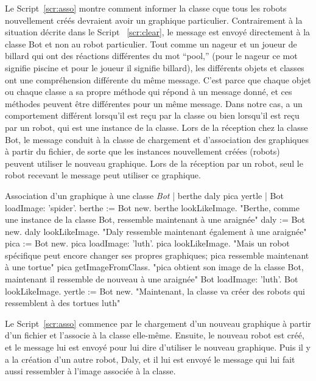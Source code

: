 \documentclass[a4paper,10pt,twoside]{book}
\begin{document}
Le Script~\ref{scr:asso} montre comment informer la classe  cque tous les robots 
nouvellement cr\'e\'es devraient avoir un graphique particulier. Contrairement \`a la situation 
d\'ecrite dans le Script ~\ref{scr:clear}, le message  est envoy\'e directement 
\`a la classe Bot et non au robot particulier. Tout comme un nageur et un joueur de billard qui ont 
des r\'eactions diff\'erentes du mot  “pool,” (pour le nageur ce mot signifie piscine et pour le 
joueur il signifie billard), les diff\'erents objets et classes ont une compr\'ehension diff\'erente 
du m\^eme message. C'est parce que chaque objet ou chaque classe a sa propre m\'ethode qui r\'epond \`a 
un message donn\'e, et ces m\'ethodes peuvent \^etre diff\'erentes pour un m\^eme message. Dans notre cas, 
 a un comportement diff\'erent lorsqu'il est reçu par la classe ou bien lorsqu'il 
est reçu par un robot, qui est une instance de la classe. Lors de la r\'eception chez la classe Bot, 
le message  conduit \`a la classe de chargement et d'association des 
graphiques \`a partir du fichier, de sorte que les instances nouvellement cr\'e\'ees (robots) peuvent 
utiliser le nouveau graphique. Lors de la r\'eception par un robot, seul le robot recevant le 
message peut utiliser ce graphique. 


\begin{script}[asso]{Association d'un graphique \`a une classe \emph{Bot}}
	| berthe daly pica yertle | 
	Bot loadImage: 'spider'. 
	berthe := Bot new. 
	berthe lookLikeImage. 
	"Berthe, comme une instance de la classe Bot, ressemble maintenant \`a une araign\'ee" 
	daly := Bot new. 
	daly lookLikeImage. 
	"Daly ressemble maintenant \'egalement \`a une araign\'ee" 
	pica := Bot new. 
	pica loadImage: 'luth'. 
	pica lookLikeImage. 
	"Mais un robot sp\'ecifique peut encore changer ses propres graphiques; pica ressemble maintenant \`a une tortue" 
	pica getImageFromClass. 
	"pica obtient son image de la classe Bot, maintenant il ressemble de nouveau \`a une araign\'ee" 
	Bot loadImage: 'luth'. 
	Bot lookLikeImage. 
	yertle := Bot new. 
	"Maintenant, la classe va cr\'eer des robots qui ressemblent \`a des tortues luth"
\end{script}

Le Script~\ref{scr:asso} commence par le chargement d'un nouveau graphique \`a partir d'un fichier et l'associe \`a 
la classe  elle-m\^eme. Ensuite, le nouveau robot est cr\'e\'e, et le message lui est envoy\'e 
pour lui dire d'utiliser le nouveau graphique. Puis il y a la cr\'eation d'un autre robot, Daly, et 
il lui est envoy\'e le message  qui lui fait aussi ressembler \`a l'image associ\'ee \`a la classe.
\end{document}
